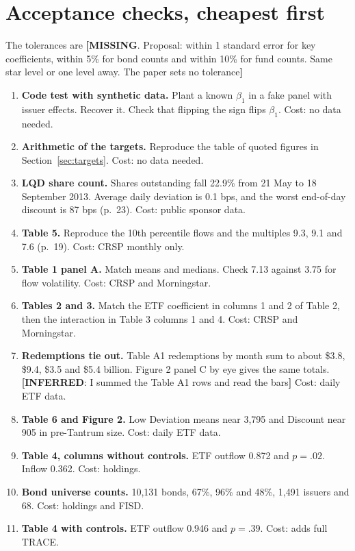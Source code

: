 \documentclass[10pt,a4paper]{article}
\newcommand{\IN}[1]{\textcolor{cin}{\textbf{[INFERRED}: #1\textbf{]}}}
\newcommand{\MI}[1]{\textcolor{cmi}{\textbf{[MISSING}. Proposal: #1\textbf{]}}}
\begin{document}
\section{Acceptance checks, cheapest first}\label{sec:accept}

The tolerances are \MI{within 1 standard error for key coefficients, within 5\% for bond counts and within 10\% for fund counts. Same star level or one level away. The paper sets no tolerance}

\begin{enumerate}
\item \textbf{Code test with synthetic data.} Plant a known $\beta_1$ in a fake panel with issuer effects. Recover it. Check that flipping the sign flips $\beta_1$. Cost: no data needed.
\item \textbf{Arithmetic of the targets.} Reproduce the table of quoted figures in Section~\ref{sec:targets}. Cost: no data needed.
\item \textbf{LQD share count.} Shares outstanding fall 22.9\% from 21 May to 18 September 2013. Average daily deviation is 0.1 bps, and the worst end-of-day discount is 87 bps (p.~23). Cost: public sponsor data.
\item \textbf{Table 5.} Reproduce the 10th percentile flows and the multiples 9.3, 9.1 and 7.6 (p.~19). Cost: CRSP monthly only.
\item \textbf{Table 1 panel A.} Match means and medians. Check 7.13 against 3.75 for flow volatility. Cost: CRSP and Morningstar.
\item \textbf{Tables 2 and 3.} Match the ETF coefficient in columns 1 and 2 of Table 2, then the interaction in Table 3 columns 1 and 4. Cost: CRSP and Morningstar.
\item \textbf{Redemptions tie out.} Table A1 redemptions by month sum to about \$3.8, \$9.4, \$3.5 and \$5.4 billion. Figure 2 panel C by eye gives the same totals. \IN{I summed the Table A1 rows and read the bars} Cost: daily ETF data.
\item \textbf{Table 6 and Figure 2.} Low Deviation means near 3,795 and Discount near 905 in pre-Tantrum size. Cost: daily ETF data.
\item \textbf{Table 4, columns without controls.} ETF outflow 0.872 and $p=.02$. Inflow 0.362. Cost: holdings.
\item \textbf{Bond universe counts.} 10,131 bonds, 67\%, 96\% and 48\%, 1,491 issuers and 68. Cost: holdings and FISD.
\item \textbf{Table 4 with controls.} ETF outflow 0.946 and $p=.39$. Cost: adds full TRACE.

\end{enumerate}
\end{document}
